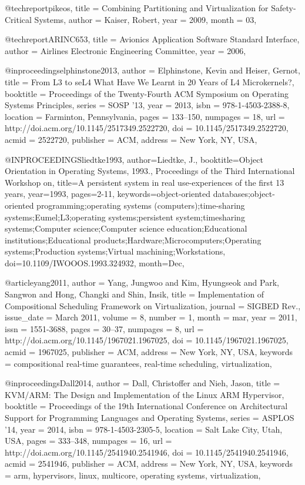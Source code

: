 @techreport{pikeos,
     title = {{Combining Partitioning and Virtualization for Safety-Critical Systems}},
     author = {Kaiser, Robert},
     year = {2009},
     month = {03},
}

@techreport{ARINC653,
     title = {{Avionics Application Software Standard Interface}},
     author = {{Airlines Electronic Engineering Committee}},
     year = {2006},
}

@inproceedings{elphinstone2013,
 author = {Elphinstone, Kevin and Heiser, Gernot},
 title = {From L3 to seL4 What Have We Learnt in 20 Years of L4 Microkernels?},
 booktitle = {Proceedings of the Twenty-Fourth ACM Symposium on Operating Systems Principles},
 series = {SOSP '13},
 year = {2013},
 isbn = {978-1-4503-2388-8},
 location = {Farminton, Pennsylvania},
 pages = {133--150},
 numpages = {18},
 url = {http://doi.acm.org/10.1145/2517349.2522720},
 doi = {10.1145/2517349.2522720},
 acmid = {2522720},
 publisher = {ACM},
 address = {New York, NY, USA},
} 


@INPROCEEDINGS{liedtke1993, 
author={Liedtke, J.}, 
booktitle={Object Orientation in Operating Systems, 1993., Proceedings of the Third International Workshop on}, 
title={A persistent system in real use-experiences of the first 13 years}, 
year={1993}, 
pages={2-11}, 
keywords={object-oriented databases;object-oriented programming;operating systems (computers);time-sharing systems;Eumel;L3;operating systems;persistent system;timesharing systems;Computer science;Computer science education;Educational institutions;Educational products;Hardware;Microcomputers;Operating systems;Production systems;Virtual machining;Workstations}, 
doi={10.1109/IWOOOS.1993.324932}, 
month={Dec},}

@article{yang2011,
 author = {Yang, Jungwoo and Kim, Hyungseok and Park, Sangwon and Hong, Changki and Shin, Insik},
 title = {Implementation of Compositional Scheduling Framework on Virtualization},
 journal = {SIGBED Rev.},
 issue_date = {March 2011},
 volume = {8},
 number = {1},
 month = mar,
 year = {2011},
 issn = {1551-3688},
 pages = {30--37},
 numpages = {8},
 url = {http://doi.acm.org/10.1145/1967021.1967025},
 doi = {10.1145/1967021.1967025},
 acmid = {1967025},
 publisher = {ACM},
 address = {New York, NY, USA},
 keywords = {compositional real-time guarantees, real-time scheduling, virtualization},
} 

@inproceedings{Dall2014,
 author = {Dall, Christoffer and Nieh, Jason},
 title = {KVM/ARM: The Design and Implementation of the Linux ARM Hypervisor},
 booktitle = {Proceedings of the 19th International Conference on Architectural Support for Programming Languages and Operating Systems},
 series = {ASPLOS '14},
 year = {2014},
 isbn = {978-1-4503-2305-5},
 location = {Salt Lake City, Utah, USA},
 pages = {333--348},
 numpages = {16},
 url = {http://doi.acm.org/10.1145/2541940.2541946},
 doi = {10.1145/2541940.2541946},
 acmid = {2541946},
 publisher = {ACM},
 address = {New York, NY, USA},
 keywords = {arm, hypervisors, linux, multicore, operating systems, virtualization},
}



